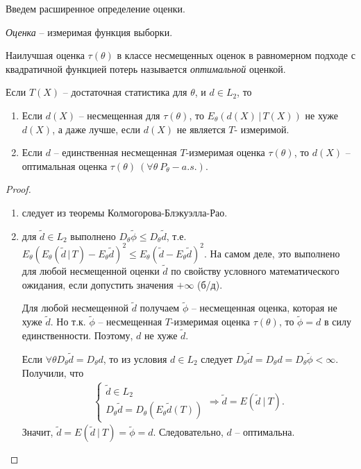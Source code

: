 Введем расширенное определение оценки.
\begin{definition}
    \textit{Оценка} -- измеримая функция выборки.
\end{definition}
\begin{definition}
    Наилучшая оценка $\tau(\theta)$ в классе несмещенных оценок в равномерном подходе с квадратичной функцией потерь называется \textit{оптимальной} оценкой.
\end{definition}
\begin{corollary}
    Если $T(X)$ -- достаточная статистика для $\theta$, и $d\in L_2$, то
    \begin{enumerate}
        \item Если $d(X)$ -- несмещенная для $\tau(\theta)$, то $E_\theta(d(X)\, \vert\, T(X))$ не хуже $d(X)$, а даже лучше, если $d(X)$ не является $T$- измеримой.
        \item Если $d$ -- единственная несмещенная $T$-измеримая оценка $\tau(\theta)$, то $d(X)$ -- оптимальная оценка $\tau(\theta)\ (\forall \theta\ P_\theta-a.s.)$.
    \end{enumerate}
\end{corollary}
\begin{proof} ~
    \begin{enumerate}
        \item следует из теоремы Колмогорова-Блэкуэлла-Рао.
        \item для $\widetilde{d} \in L_2$ выполнено $D_\theta\widetilde{\phi} \leq D_\theta\widetilde{d}$, т.е. $E_\theta\left(E_\theta\left(\widetilde{d}\, \vert\, T\right) - E_\theta\widetilde{d}\right)^2 \leq E_\theta\left(\widetilde{d} - E_\theta\widetilde{d}\right)^2$. На самом деле, это выполнено для любой несмещенной оценки $\widetilde{d}$ по свойству условного математического ожидания, если допустить значения $+\infty$ (б/д).
        
        Для любой несмещенной $\widetilde{d}$ получаем $\widetilde{\phi}$ -- несмещенная оценка, которая не хуже $\widetilde{d}$. Но т.к. $\widetilde{\phi}$ -- несмещенная $T$-измеримая оценка $\tau(\theta)$, то $\widetilde{\phi} = d$ в силу единственности. Поэтому, $d$ не хуже $\widetilde{d}$.
        
        Если $\forall \theta D_\theta\widetilde{d} = D_\theta d$, то из условия $d \in L_2$ следует $D_\theta\widetilde{d} = D_\theta d = D_\theta\widetilde{\phi} < \infty$. Получили, что
        \begin{gather*}
            \begin{cases}
                \tilde{d} \in L_{2}\\
                D_{\theta }\tilde{d} =D_{\theta }\left( E_{\theta }\tilde{d}( T)\right)
            \end{cases} \Rightarrow \tilde{d} =E\left(\tilde{d} \ |\ T\right).
        \end{gather*}
        Значит, $\displaystyle \tilde{d} =E\left(\tilde{d} \ |\ T\right) =\tilde{\phi } =d$. Следовательно, $\displaystyle d$ -- оптимальна.
    \end{enumerate}
\end{proof}
